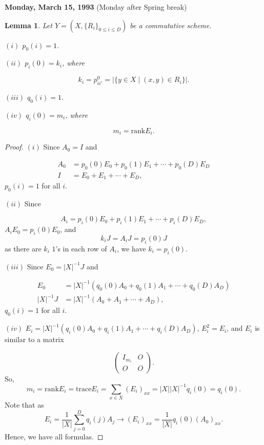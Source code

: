 \documentclass[
]{book}
\newtheorem{lemma}{Lemma}[chapter]
\theoremstyle{definition}
\theoremstyle{definition}
\theoremstyle{definition}
\theoremstyle{definition}
\theoremstyle{remark}
\begin{document}
\textbf{Monday, March 15, 1993} (Monday after Spring break)

\begin{lemma}
\protect\hypertarget{lem:pij-qij}{}\label{lem:pij-qij}Let \(Y = (X, \{R_i\}_{0\leq i\leq D})\) be a commutative scheme.

\((i)\) \(p_0(i) = 1\).

\((ii)\) \(p_i(0) = k_i\), where

\[k_i = p^0_{ii'} = |\{y\in X\mid (x,y)\in R_i\}|.\]

\((iii)\) \(q_0(i) = 1\).

\((iv)\) \(q_i(0) = m_i\), where

\[m_i = \mathrm{rank} E_i.\]
\end{lemma}

\begin{proof}
\leavevmode

\((i)\) Since \(A_0 = I\) and

\begin{align}
A_0 & = p_0(0)E_0 + p_0(1)E_1 + \cdots + p_0(D)E_D\\
I & = E_0 + E_1 + \cdots + E_D,
\end{align}
\(p_0(i) = 1\) for all \(i\).

\((ii)\) Since

\[A_i = p_i(0)E_0 + p_i(1)E_1 + \cdots + p_i(D)E_D,\]
\(A_i E_0 = p_i(0)E_0\), and
\[k_i J = A_i J = p_i(0)J\]
as there are \(k_i\) \(1\)'s in each row of \(A_i\), we have \(k_i = p_i(0)\).

\((iii)\) Since \(E_0 = |X|^{-1}J\) and

\begin{align}
E_0 & = |X|^{-1}(q_0(0)A_0 + q_0(1)A_1 + \cdots + q_0(D)A_D)\\
|X|^{-1}J & = |X|^{-1}(A_0 + A_1 + \cdots + A_D),
\end{align}
\(q_0(i) = 1\) for all \(i\).

\((iv)\) \(E_i = |X|^{-1}(q_i(0)A_0 + q_i(1)A_1 + \cdots + q_i(D)A_D)\), \(E_i^2 = E_i\), and \(E_i\) is similar to a matrix

\[\begin{pmatrix} I_{m_i} & O \\ O & O\end{pmatrix}.\]
So,
\[m_i = \mathrm{rank}E_i = \mathrm{trace} E_i = \sum_{x\in X}(E_i)_{xx} = |X||X|^{-1}q_i(0) = q_i(0).\]
Note that as
\[E_i = \frac{1}{|X|}\sum_{j=0}^D q_i(j)A_j \to (E_i)_{xx} = \frac{1}{|X|}q_i(0)(A_0)_{xx}.\]
Hence, we have all formulas.

\end{proof}
\end{document}
